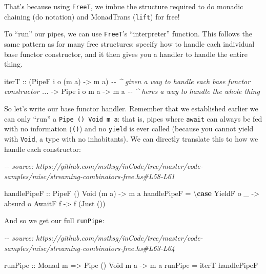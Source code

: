 \documentclass[]{article}
\newenvironment{Shaded}{}{}
\newcommand{\CommentTok}[1]{\textcolor[rgb]{0.38,0.63,0.69}{\textit{#1}}}
\newcommand{\DataTypeTok}[1]{\textcolor[rgb]{0.56,0.13,0.00}{#1}}
\newcommand{\KeywordTok}[1]{\textcolor[rgb]{0.00,0.44,0.13}{\textbf{#1}}}
\newcommand{\NormalTok}[1]{#1}
\newcommand{\OtherTok}[1]{\textcolor[rgb]{0.00,0.44,0.13}{#1}}
\begin{document}
That's because using \texttt{FreeT}, we imbue the structure required to do
monadic chaining (do notation) and MonadTrans (\texttt{lift}) for free!

To ``run'' our pipes, we can use \texttt{FreeT}'s ``interpreter'' function. This
follows the same pattern as for many free structures: specify how to handle each
individual base functor constructor, and it then gives you a handler to handle
the entire thing.

\begin{Shaded}
\begin{Highlighting}[]
\NormalTok{iterT}
\OtherTok{    ::}\NormalTok{ (}\DataTypeTok{PipeF}\NormalTok{ i o (m a) }\OtherTok{{-}>}\NormalTok{ m a)  }\CommentTok{{-}{-} \^{} given a way to handle each base functor constructor ...}
    \OtherTok{{-}>} \DataTypeTok{Pipe}\NormalTok{ i o m a }\OtherTok{{-}>}\NormalTok{ m a       }\CommentTok{{-}{-} \^{} here\textquotesingle{}s a way to handle the whole thing}
\end{Highlighting}
\end{Shaded}

So let's write our base functor handler. Remember that we established earlier we
can only ``run'' a \texttt{Pipe\ ()\ Void\ m\ a}: that is, pipes where
\texttt{await} can always be fed with no information (\texttt{()}) and no
\texttt{yield} is ever called (because you cannot yield with \texttt{Void}, a
type with no inhabitants). We can directly translate this to how we handle each
constructor:

\begin{Shaded}
\begin{Highlighting}[]
\CommentTok{{-}{-} source: https://github.com/mstksg/inCode/tree/master/code{-}samples/misc/streaming{-}combinators{-}free.hs\#L58{-}L61}

\OtherTok{handlePipeF ::} \DataTypeTok{PipeF}\NormalTok{ () }\DataTypeTok{Void}\NormalTok{ (m a) }\OtherTok{{-}>}\NormalTok{ m a}
\NormalTok{handlePipeF }\OtherTok{=}\NormalTok{ \textbackslash{}}\KeywordTok{case}
    \DataTypeTok{YieldF}\NormalTok{ o \_ }\OtherTok{{-}>}\NormalTok{ absurd o}
    \DataTypeTok{AwaitF}\NormalTok{ f   }\OtherTok{{-}>}\NormalTok{ f (}\DataTypeTok{Just}\NormalTok{ ())}
\end{Highlighting}
\end{Shaded}

And so we get our full \texttt{runPipe}:

\begin{Shaded}
\begin{Highlighting}[]
\CommentTok{{-}{-} source: https://github.com/mstksg/inCode/tree/master/code{-}samples/misc/streaming{-}combinators{-}free.hs\#L63{-}L64}

\OtherTok{runPipe ::} \DataTypeTok{Monad}\NormalTok{ m }\OtherTok{=>} \DataTypeTok{Pipe}\NormalTok{ () }\DataTypeTok{Void}\NormalTok{ m a }\OtherTok{{-}>}\NormalTok{ m a}
\NormalTok{runPipe }\OtherTok{=}\NormalTok{ iterT handlePipeF}
\end{Highlighting}
\end{Shaded}
\end{document}
